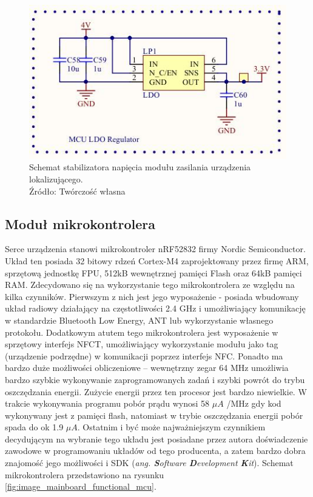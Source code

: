 \begin{figure}[H]
	\centering
	\includegraphics[width=12cm]{img/schematics/mainboard_power_ldo.jpg}
	\caption{Schemat stabilizatora napięcia modułu zasilania urządzenia lokalizującego. \\ Źródło: Twórczość własna}
	\label{fig:image_mainboard_power_ldo}
\end{figure}

\subsection{Moduł mikrokontrolera}

Serce urządzenia stanowi mikrokontroler nRF52832 firmy Nordic Semiconductor. Układ ten posiada 32 bitowy rdzeń Cortex-M4 zaprojektowany przez firmę ARM, sprzętową jednostkę FPU, 512kB wewnętrznej pamięci Flash oraz 64kB pamięci RAM. Zdecydowano się na wykorzystanie tego mikrokontrolera ze względu na kilka czynników. Pierwszym z nich jest jego wyposażenie - posiada wbudowany układ radiowy działający na częstotliwości 2.4 GHz i umożliwiający komunikację w standardzie Bluetooth Low Energy, ANT lub wykorzystanie własnego protokołu. Dodatkowym atutem tego mikrokontrolera jest wyposażenie w sprzętowy interfejs NFCT, umożliwiający wykorzystanie modułu jako tag (urządzenie podrzędne) w komunikacji poprzez interfejs NFC. Ponadto ma bardzo duże możliwości obliczeniowe – wewnętrzny zegar 64 MHz umożliwia bardzo szybkie wykonywanie zaprogramowanych zadań i szybki powrót do trybu oszczędzania energii. Zużycie energii przez ten procesor jest bardzo niewielkie. W trakcie wykonywania programu pobór prądu wynosi 58 $\mu A$ /MHz gdy kod wykonywany jest z pamięci flash, natomiast w trybie oszczędzania energii pobór spada do ok 1.9 $\mu A$. Ostatnim i być może najważniejszym czynnikiem decydującym na wybranie tego układu jest posiadane przez autora doświadczenie zawodowe w programowaniu układów od tego producenta, a zatem bardzo dobra znajomość jego możliwości i SDK (\textit{ang. \textbf{S}oftware \textbf{D}evelopment \textbf{K}it}). Schemat mikrokontrolera przedstawiono na rysunku \ref{fig:image_mainboard_functional_mcu}.

